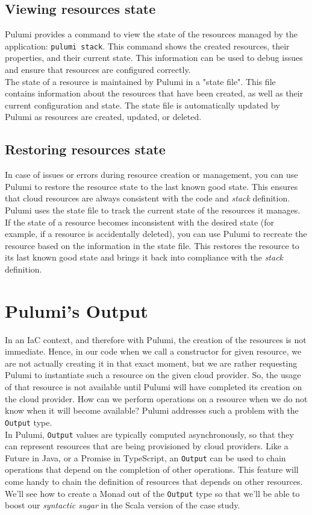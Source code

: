 \subsection{Viewing resources state}
Pulumi provides a command to view the state of the resources managed by the application: \texttt{pulumi stack}.
This command shows the created resources, their properties, and their current state. 
This information can be used to debug issues and ensure that resources are configured correctly.\\
The state of a resource is maintained by Pulumi in a "state file".
This file contains information about the resources that have been created, as well as their current configuration and state.
The state file is automatically updated by Pulumi as resources are created, updated, or deleted.

\subsection{Restoring resources state}
In case of issues or errors during resource creation or management, you can use Pulumi to restore the resource state to the last known good state.
This ensures that cloud resources are always consistent with the code and \textit{stack} definition.\\
Pulumi uses the state file to track the current state of the resources it manages.
If the state of a resource becomes inconsistent with the desired state (for example, if a resource is accidentally deleted), you can use Pulumi to recreate the resource based on the information in the state file.
This restores the resource to its last known good state and brings it back into compliance with the \textit{stack} definition.

\section{Pulumi's Output}
In an IaC context, and therefore with Pulumi, the creation of the resources is not immediate.
Hence, in our code when we call a constructor for given resource, we are not actually creating it in that exact moment, but we are rather requesting Pulumi to instantiate such a resource on the given cloud provider.
So, the usage of that resource is not available until Pulumi will have completed its creation on the cloud provider.
How can we perform operations on a resource when we do not know when it will become available?
Pulumi addresses such a problem with the \texttt{Output} type.\\
In Pulumi, \texttt{Output} values are typically computed asynchronously, so that they can represent resources that are being provisioned by cloud providers.
Like a Future in Java, or a Promise in TypeScript, an \texttt{Output} can be used to chain operations that depend on the completion of other operations.
This feature will come handy to chain the definition of resources that depends on other resources.\\
We'll see how to create a Monad out of the \texttt{Output} type so that we'll be able to boost our \textit{syntactic sugar} in the Scala version of the case study.
